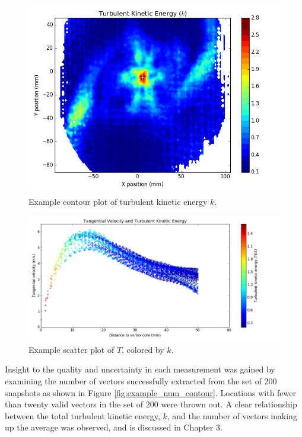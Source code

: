 {\begin{figure}[H]
	\centering
	\includegraphics[width=5in]{figs/example_vortex_figs/example_ctke_contour}
\caption{Example contour plot of turbulent kinetic energy $k$.}
\label{fig:examp_tke}
\end{figure}

\begin{figure}[H]
	\centering
	\includegraphics[width=7in]{figs/example_vortex_figs/example_TscatterTKE}
\caption{Example scatter plot of $T$, colored by $k$.}
\label{fig:examp_Tscatter}
\end{figure}

Insight to the quality and uncertainty in each measurement was gained by 
examining the number of vectors successfully extracted from the set of 200 
snapshots as shown in Figure \ref{fig:example_num_contour}. Locations with 
fewer than twenty valid vectors in the set of 200 were thrown out. A clear 
relationship between the total turbulent kinetic energy, $k$, and the number of 
vectors making up the average was observed, and is discussed in Chapter 3.

}
